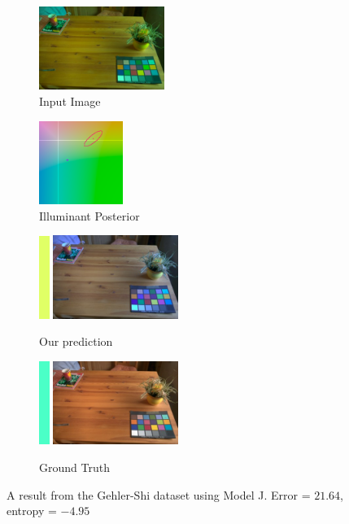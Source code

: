 \documentclass[10pt,twocolumn,letterpaper]{article}
\begin{document}
\begin{figure}[!]
\centering
  \begin{subfigure}[!]{1.7in}
    \includegraphics[width=1.6in]{figures/results/gehlershi/00000047_input.jpg}
    \caption{\footnotesize Input Image}
  \end{subfigure}
  \begin{subfigure}[!]{1.17in}
    \includegraphics[width=1.07in]{figures/results/gehlershi/00000047_chroma.png}
    \caption{\footnotesize Illuminant Posterior}
  \end{subfigure}
\begin{subfigure}[!]{1.9in}
    \includegraphics[width=0.133in]{figures/results/gehlershi/00000047_illum.png}\!
    \includegraphics[width=1.6in]{figures/results/gehlershi/00000047_prediction.jpg}
    \caption{\footnotesize Our prediction}
  \end{subfigure}
  \begin{subfigure}[!]{1.9in}
    \includegraphics[width=0.133in]{figures/results/gehlershi/00000047_illum_true.png}\!
    \includegraphics[width=1.6in]{figures/results/gehlershi/00000047_true.jpg}
    \caption{\footnotesize Ground Truth}
  \end{subfigure}
  \caption{
    A result from the Gehler-Shi dataset using Model J. Error = $21.64$\textdegree, entropy = $-4.95$
    \label{fig:results10}
  }
\end{figure}
\end{document}
